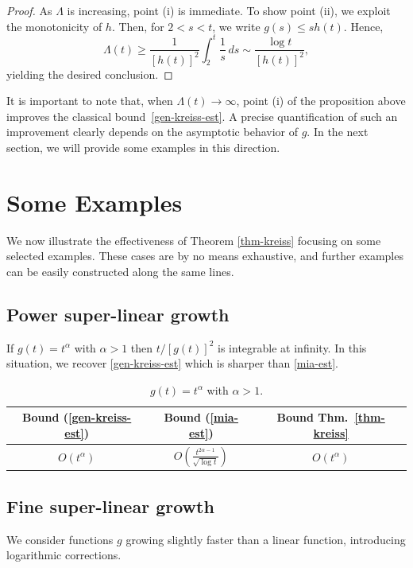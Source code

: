 \documentclass[12pt]{amsart}
\theoremstyle{plain}
\theoremstyle{definition}
\numberwithin{equation}{section}
\begin{document}
\begin{proof}
As $\Lambda$ is increasing, point (i) is immediate.
To show point (ii), we exploit the monotonicity of $h$.
Then, for $2<s<t$, we write $g(s)\leq sh(t)$. Hence,
$$\Lambda(t)\geq \frac{1}{[h(t)]^2} \int_2^t\frac{1}{s}\,ds
\sim \frac{\log t}{[h(t)]^2},$$
yielding the desired conclusion.
\end{proof}

It is important to note that, when $\Lambda(t)\to\infty$, point (i) of the proposition above
improves the classical bound~\eqref{gen-kreiss-est}.
A precise quantification of such an improvement clearly depends
on the asymptotic behavior of $g$. In the next section, we will provide some examples in this direction.


\section{Some Examples}

\noindent
We now illustrate the effectiveness of Theorem \ref{thm-kreiss}
focusing on some selected examples.
These cases are by no means exhaustive, and further examples can be easily constructed along the same lines.

\subsection{Power super-linear growth}
If $g(t)=t^\alpha$ with $\alpha>1$ then $t/[g(t)]^2$ is integrable at infinity.
In this situation, we recover \eqref{gen-kreiss-est}
which is sharper than \eqref{mia-est}.

\begin{table}[htbp]
\centering
\renewcommand{\arraystretch}{2.1}
\setlength{\tabcolsep}{18pt}
\begin{tabular}{|c|c|c|}
\hline
\textbf{Bound (\ref{gen-kreiss-est})} & \textbf{Bound (\ref{mia-est})} & \textbf{Bound Thm.\ \ref{thm-kreiss}} \\
\hline\hline
$O(t^\alpha)$ & $O\left(\displaystyle\frac{t^{2\alpha-1}}{\sqrt{\log t}}\right)$ & ${O(t^\alpha)}$ \\[1ex]
\hline
\end{tabular}
\vspace{0.3cm}
\caption{$g(t)=t^\alpha$ with $\alpha > 1$.}
\end{table}

\subsection{Fine super-linear growth}
We consider functions $g$ growing slightly faster than a linear function, introducing logarithmic corrections.
\end{document}
